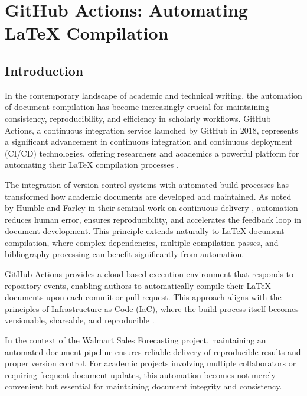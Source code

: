 %
%
%

\chapter{GitHub Actions: Automating LaTeX Compilation }


\section{Introduction}


In the contemporary landscape of academic and technical writing, the automation of document compilation has become increasingly crucial for maintaining consistency, reproducibility, and efficiency in scholarly workflows. GitHub Actions, a continuous integration service launched by GitHub in 2018, represents a significant advancement in continuous integration and continuous deployment (CI/CD) technologies, offering researchers and academics a powerful platform for automating their LaTeX compilation processes \cite{Chacon:2014, Kim:2016, GitHub:2023}.

The integration of version control systems with automated build processes has transformed how academic documents are developed and maintained. As noted by Humble and Farley in their seminal work on continuous delivery \cite{Humble:2010}, automation reduces human error, ensures reproducibility, and accelerates the feedback loop in document development. This principle extends naturally to LaTeX document compilation, where complex dependencies, multiple compilation passes, and bibliography processing can benefit significantly from automation.

GitHub Actions provides a cloud-based execution environment that responds to repository events, enabling authors to automatically compile their LaTeX documents upon each commit or pull request. This approach aligns with the principles of Infrastructure as Code (IaC), where the build process itself becomes versionable, shareable, and reproducible \cite{Morris:2016}. 

In the context of the Walmart Sales Forecasting project, maintaining an automated document pipeline ensures reliable delivery of reproducible results and proper version control. For academic projects involving multiple collaborators or requiring frequent document updates, this automation becomes not merely convenient but essential for maintaining document integrity and consistency.

